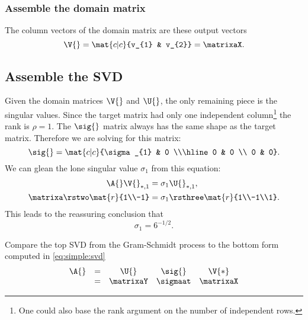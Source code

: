 \subsubsection{Assemble the domain matrix}
The column vectors of the domain matrix are these output vectors
\begin{equation}
  \V{} = \mat{c|c}{v_{1} & v_{2}} = \matrixaX.
\end{equation}

\subsection{Assemble the SVD}
Given the domain matrices $\V{}$ and $\U{}$, the only remaining piece is the singular values. Since the target matrix had only one independent column\footnote{One could also base the rank argument on the number of independent rows.} the rank is $\rho = 1$. The $\sig{}$ matrix always has the same shape as the target matrix. Therefore we are solving for this matrix:
\begin{equation}
  \sig{} = \mat{c|c}{\sigma_{1} & 0 \\\hline 0 & 0 \\ 0 & 0}.
\end{equation}
We can glean the lone singular value $\sigma_{1}$ from this equation:
\begin{equation}
  \begin{split}
    \A{}\V{}_{*,1} &= \sigma_{1}\U{}_{*,1},\\
    \matrixa \rstwo \mat{r}{1\\-1} &= \sigma_{1} \rsthree \mat{r}{1\\-1\\1}.
  \end{split}
\end{equation}
This leads to the reassuring conclusion that
\begin{equation}
  \sigma_{1} = 6^{-1/2}.
\end{equation}

Compare the top SVD from the Gram-Schmidt process to the bottom form computed in \eqref{eq:simple:svd}
\begin{equation}
  \begin{array}{rcccc}
    \A{} 
      &=& \U{} & \sig{} & \V{*} \\
      &=& \matrixaY  
        & \sigmaat 
        & \matrixaX   
  \end{array}
\end{equation}


